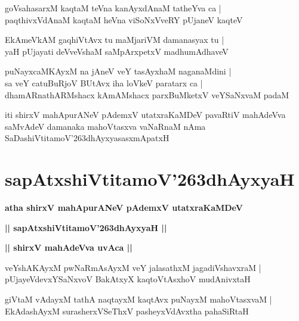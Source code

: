 \documentclass[twoside,12pt,openright]{book}
\def\S{\char'263}
\newcounter{shloka}[chapter]
\def\uvaca#1{\centerline{{\large\textbf{#1}}}}
\begin{document}
\begin{shloka}%
goVsahasarxM kaqtaM teVna kanAyxdAnaM tatheYva ca |\\
paqthivxVdAnaM kaqtaM heVna viSoNxVveRY pUjaneV kaqteV 
\end{shloka}

\begin{shloka}%
EkAmeVkAM gaqhiVtAvx tu maMjariVM damanasyax tu |\\
yaH pUjayati deVveVshaM saMpArxpetxV madhumAdhaveV
\end{shloka}

\begin{shloka}%
puNayxcaMKAyxM na jAneV veY tasAyxhaM naganaMdini |\\
sa veY catuBuRjoV BUtAvx iha loVkeV paratarx ca |\\
dhamARnathARMshacx kAmAMshacx parxBuMketxV veYSaNxvaM padaM
\end{shloka}

\begin{center}
iti shirxV mahApurANeV pAdemxV utatxraKaMDeV pavaRtiV mahAdeVva saMvAdeV damanaka mahoVtasxva 
vaNaRnaM nAma SaDashiVtitamoV\S dhAyxyasasxmApatxH 
\end{center}

\chapter{sapAtxshiVtitamoV\S dhAyxyaH}

\begin{center}
{\LARGE\bfseries atha shirxV mahApurANeV pAdemxV utatxraKaMDeV}
\end{center}

\begin{center}
{\LARGE\bfseries || sapAtxshiVtitamoV\S dhAyxyaH || }
\end{center}

\uvaca{|| shirxV mahAdeVva uvAca ||}

\begin{shloka}%
veYshAKAyxM pwNaRmAsAyxM veY jalasathxM jagadiVshavxraM |\\
pUjayeVdevxYSaNxvoV BakAtxyX kaqtoVtAsxhoV mudAnivxtaH 
\end{shloka}

\begin{shloka}%
giVtaM vAdayxM tathA naqtayxM kaqtAvx puNayxM mahoVtasxvaM |\\
EkAdashAyxM surasherxVSeThxV pasheyxVdAvxtha pahaSiRtaH
\end{shloka}
\end{document}
